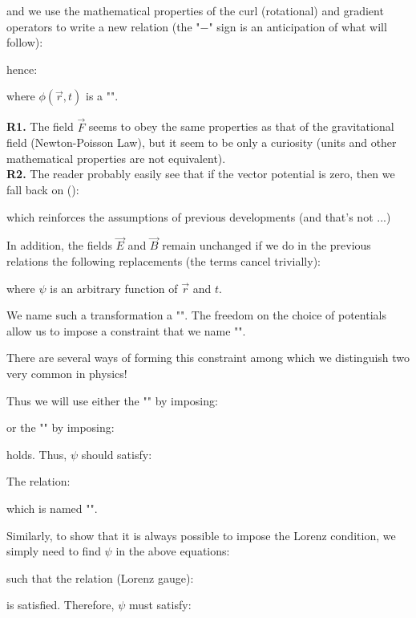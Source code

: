 	and we use the mathematical properties of the curl (rotational) and gradient operators to write a new relation (the "$-$" sign is an anticipation of what will follow):
	
	hence:
	
	where $\phi(\vec{r},t)$ is a "". 
	\begin{tcolorbox}[title=Remarks,colframe=black,arc=10pt]
	\textbf{R1.} The field $\vec{F}$ seems to obey the same properties as that of the gravitational field (Newton-Poisson Law), but it seem to be only a curiosity (units and other mathematical properties are not equivalent).\\
	
	\textbf{R2.} The reader probably easily see that if the vector potential is zero, then we fall back on ():
	
	which reinforces the assumptions of previous developments (and that's not ...)
	\end{tcolorbox}
	In addition, the fields $\vec{E}$ and $\vec{B}$ remain unchanged if we do in the previous relations the following replacements (the terms cancel trivially):
	
	where $\psi$ is an arbitrary function of $\vec{r}$ and $t$.
	
	We name such a transformation a "". The freedom on the choice of potentials allow us to impose a constraint that we name "".
	
	There are several ways of forming this constraint among which we distinguish two very common in physics!

	Thus we will use either the "" by imposing:
	
	or the "" by imposing:
	
	holds. Thus, $\psi$ should satisfy:
	
	The relation:
	
	which is named "".
	
	Similarly, to show that it is always possible to impose the Lorenz condition, we simply need to find $\psi$ in the above equations:
	
	such that the relation (Lorenz gauge):
	
	is satisfied. Therefore, $\psi$ must satisfy:
	
